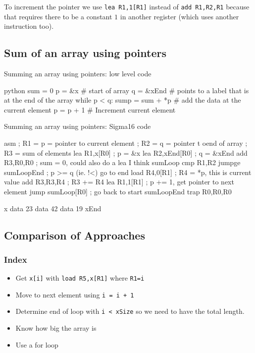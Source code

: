 \begin{note}
	To increment the pointer we use \texttt{lea R1,1[R1]} instead of \texttt{add R1,R2,R1} because that requires there to be a constant \(1\) in another register (which uses another instruction too).
\end{note}

\subsection{Sum of an array using pointers}\label{sub:sum_of_an_array_using_pointers}
\begin{highlight}{Summing an array using pointers: low level code}
\begin{code}{python}
		sum = 0
		p = &x # start of array
q = &xEnd # points to a label that is at the end of the array
		while p < q:
		sump = sum + *p # add the data at the current element
		p = p + 1 # Increment current element
\end{code}
\end{highlight}
\begin{highlight}{Summing an array using pointers: Sigma16 code}
\begin{code}{asm}
		; R1 = p = pointer to current element
		; R2 = q = pointer t oend of array
; R3 = sum of elements
		lea R1,x[R0] ; p = &x
		lea R2,xEnd[R0] ; q = &xEnd
		add R3,R0,R0 ; sum = 0, could also do a lea I think
		sumLoop
		cmp R1,R2
		jumpge sumLoopEnd ; p >= q  (ie. !<) go to end
		load R4,0[R1] ; R4 = *p, this is current value
		add R3,R3,R4 ; R3 += R4
		lea R1,1[R1] ; p += 1, get pointer to next element
		jump sumLoop[R0] ; go back to start
		sumLoopEnd
		trap R0,R0,R0

		x   data 23
		data 42
		data 19
		xEnd
\end{code}
\end{highlight}

\subsection{Comparison of Approaches}\label{sub:comparison_of_approaches}

\subsubsection{Index}\label{ssub:index}

\begin{itemize}
	\item Get \texttt{x[i]} with \texttt{load R5,x[R1]} where \texttt{R1=i}
	\item Move to next element using \texttt{i = i + 1}
	\item Determine end of loop with \texttt{i < xSize} so we need to have the total length.
	\item Know how big the array is
	\item Use a for loop
\end{itemize}

